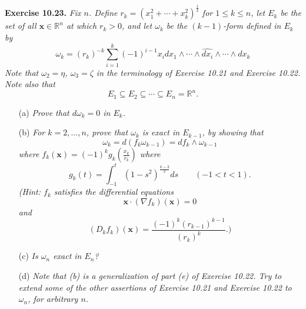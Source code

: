 \documentclass{article}
\begin{document}



\textbf{Exercise 10.23.}
\emph{Fix $n$.
Define $r_k = (x_1^2+\cdots+x_k^2)^{\frac{1}{2}}$ for $1 \leq k \leq n$,
let $E_k$ be the set of all $\mathbf{x} \in \mathbb{R}^n$ at which $r_k > 0$,
and let $\omega_k$ be the $(k-1)$-form defined in $E_k$ by
\[
  \omega_k
  = (r_k)^{-k}
    \sum_{i=1}^{k} (-1)^{i-1} x_i
    dx_1 \wedge \cdots \wedge \widehat{dx_i} \wedge \cdots \wedge dx_k
\]
Note that $\omega_2 = \eta$, $\omega_3 = \zeta$ in the terminology of
Exercise 10.21 and Exercise 10.22.
Note also that}
\[
  E_1 \subseteq E_2 \subseteq \cdots \subseteq E_n = \mathbb{R}^n.
\]
\begin{enumerate}
\item[(a)]
  \emph{Prove that $d\omega_k = 0$ in $E_k$.}

\item[(b)]
  \emph{For $k=2,\ldots,n$, prove that $\omega_k$ is exact in $E_{k-1}$,
  by showing that
  \[
    \omega_k = d(f_k\omega_{k-1}) = df_k \wedge \omega_{k-1}
  \]
  where $f_k(\mathbf{x}) = (-1)^k g_k\left( \frac{x_k}{r_k} \right)$
  where
  \[
    g_k(t) = \int_{-1}^{t} (1-s^2)^{\frac{k-3}{2}} ds
    \qquad
    (-1 < t < 1).
  \]
  (Hint: $f_k$ satisfies the differential equations
  \[
    \mathbf{x} \cdot (\nabla f_k)(\mathbf{x}) = 0
  \]
  and
  \[
    (D_k f_k)(\mathbf{x}) = \frac{(-1)^k(r_{k-1})^{k-1}}{(r_k)^k}.)
  \]}

\item[(c)]
  \emph{Is $\omega_n$ exact in $E_n$?}

\item[(d)]
  \emph{Note that (b) is a generalization of part (e) of Exercise 10.22.
  Try to extend some of the other assertions of Exercise 10.21 and Exercise 10.22
  to $\omega_n$, for arbitrary $n$.} \\
\end{enumerate}
\end{document}
